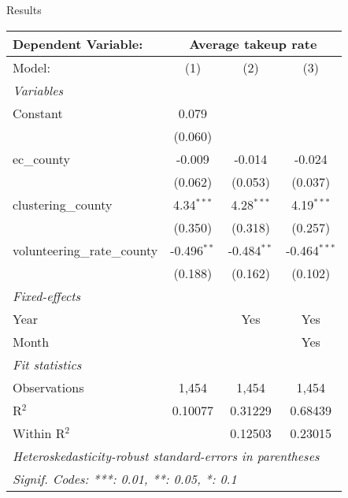 \documentclass[xcolor=dvipsnames]{beamer} %
\begin{document}
\begin{frame}{}
\begin{columns}[t]
\begin{column}{.3\linewidth}
\begin{block}{\LARGE Results}
 \begin{table}[h!]
   \centering
   \begin{tabular}{lccc}
      \tabularnewline \midrule \midrule
      Dependent Variable:  & \multicolumn{3}{c}{Average takeup rate}\\
      \hline
      Model:                       & (1)            & (2)            & (3)\\  
      \midrule
      \emph{Variables}\\
      Constant                     & 0.079          &                &   \\   
                                   & (0.060)        &                &   \\   
      ec\_county                   & -0.009         & -0.014         & -0.024\\   
                                   & (0.062)        & (0.053)        & (0.037)\\   
      clustering\_county           & 4.34$^{***}$   & 4.28$^{***}$   & 4.19$^{***}$\\   
                                   & (0.350)        & (0.318)        & (0.257)\\   
      volunteering\_rate\_county   & -0.496$^{**}$ & -0.484$^{**}$ & -0.464$^{***}$\\   
                                   & (0.188)        & (0.162)        & (0.102)\\   
      \midrule
      \emph{Fixed-effects}\\
      Year                         &                & Yes            & Yes\\  
      Month                        &                &                & Yes\\  
      \midrule
      \emph{Fit statistics}\\
      Observations                 & 1,454          & 1,454          & 1,454\\  
      R$^2$                        & 0.10077        & 0.31229        & 0.68439\\  
      Within R$^2$                 &                & 0.12503        & 0.23015\\  
      \midrule \midrule
      \multicolumn{4}{l}{\emph{Heteroskedasticity-robust standard-errors in parentheses}}\\
      \multicolumn{4}{l}{\emph{Signif. Codes: ***: 0.01, **: 0.05, *: 0.1}}\\
   \end{tabular}
\end{table}
        

\end{block}
\end{column}
\end{columns}
\end{frame}
\end{document}
